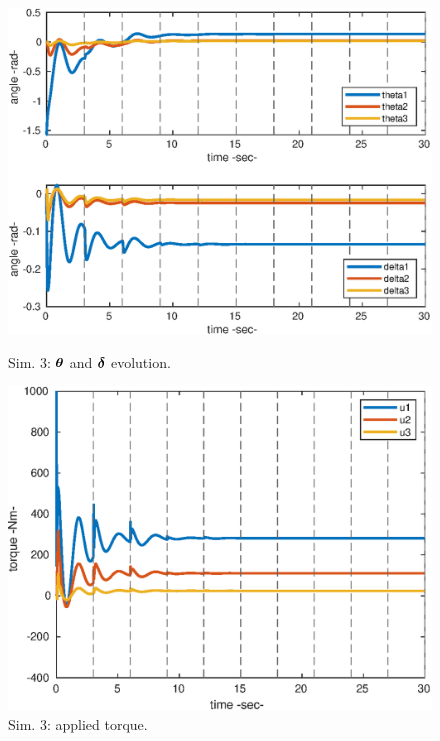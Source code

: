 \begin{center}
\begin{figure}[h!]
\begin{minipage}[h!]{0.45\linewidth}
\begin{center}
    \includegraphics[scale=0.52]{figures/2_2_thetadelta.eps}
    \caption{\label{2_2qt} 
    Sim. 3: $\boldsymbol{\theta}$ and $\boldsymbol{\delta}$ evolution.}
    \vspace{1cm}
    \hspace{-0.1cm}\includegraphics[scale=0.51]{figures/2_2_effort.eps}
    \caption{\label{2_2ceff} 
    Sim. 3: applied torque.}
\end{center}
\end{minipage}
\end{figure}
\end{center}


